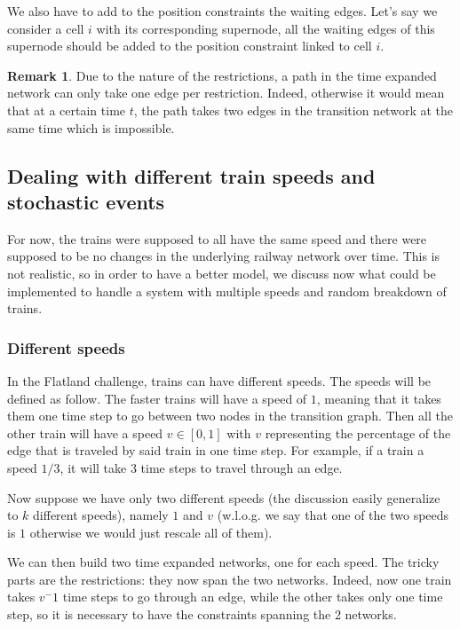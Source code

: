 \documentclass[14pt,a4paper]{article}
\theoremstyle{definition}
\newtheorem*{remark}{Remark}
\numberwithin{equation}{subsection}
\begin{document}
We also have to add to the position constraints the waiting edges. Let's say we consider a cell $i$ with its corresponding supernode, all the waiting edges of this supernode should be added to the position constraint linked to cell $i$.

\begin{remark}
	Due to the nature of the restrictions, a path in the time expanded network can only take one edge per restriction. Indeed, otherwise it would mean that at a certain time $t$, the path takes two edges in the transition network at the same time which is impossible.
\end{remark}



\subsection{Dealing with different train speeds and stochastic events}

For now, the trains were supposed to all have the same speed and there were supposed to be no changes in the underlying railway network over time. This is not realistic, so in order to have a better model, we discuss now what could be implemented to handle a system with multiple speeds and random breakdown of trains.


\subsubsection{Different speeds}

In the Flatland challenge, trains can have different speeds. The speeds will be defined as follow. The faster trains will have a speed of $1$, meaning that it takes them one time step to go between two nodes in the transition graph. Then all the other train will have a speed $v \in [0,1]$ with $v$ representing the percentage of the edge that is traveled by said train in one time step. For example, if a train a speed $1/3$, it will take 3 time steps to travel through an edge.

Now suppose we have only two different speeds (the discussion easily generalize to $k$ different speeds), namely $1$ and $v$ (w.l.o.g. we say that one of the two speeds is $1$ otherwise we would just rescale all of them).

We can then build two time expanded networks, one for each speed. The tricky parts are the restrictions: they now span the two networks. Indeed, now one train takes $v^-1$ time steps to go through an edge, while the other takes only one time step, so it is necessary to have the constraints spanning the 2 networks.
\end{document}
